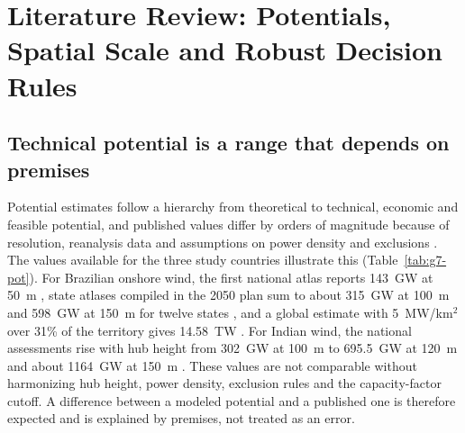 
\section{Literature Review: Potentials, Spatial Scale and Robust Decision Rules}
\label{sec:g7-lit}

\subsection{Technical potential is a range that depends on premises}
Potential estimates follow a hierarchy from theoretical to technical, economic and feasible potential, and published values differ by orders of magnitude because of resolution, reanalysis data and assumptions on power density and exclusions \citep{angliviel2023}. The values available for the three study countries illustrate this (Table~\ref{tab:g7-pot}). For Brazilian onshore wind, the first national atlas reports 143~GW at 50~m \citep{amarante2001}, state atlases compiled in the 2050 plan sum to about 315~GW at 100~m and 598~GW at 150~m for twelve states \citep{epe2020pne}, and a global estimate with 5~MW/km$^2$ over 31\% of the territory gives 14.58~TW \citep{eurek2017}. For Indian wind, the national assessments rise with hub height from 302~GW at 100~m to 695.5~GW at 120~m and about 1164~GW at 150~m \citep{niwe_atlas}. These values are not comparable without harmonizing hub height, power density, exclusion rules and the capacity-factor cutoff. A difference between a modeled potential and a published one is therefore expected and is explained by premises, not treated as an error.

